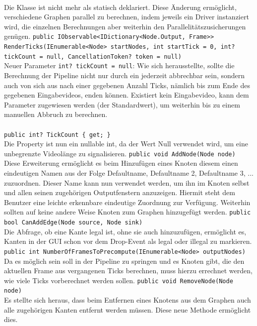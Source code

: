 \paragraph{}
\begin{itemize}
	\change Die Klasse ist nicht mehr als statisch deklariert. Diese Änderung ermöglicht, verschiedene Graphen parallel zu berechnen, indem jeweils ein Driver instanziert wird, die einzelnen Berechnungen aber weiterhin den Parallelitätszusicherungen genügen.
	\add \verb!public IObservable<IDictionary<Node.Output, Frame>> RenderTicks(IEnumerable<Node> startNodes, int startTick = 0, int? tickCount = null, CancellationToken? token = null)! \\
	Neuer Parameter \verb!int? tickCount = null!: Wie sich herausstellte, sollte die Berechnung der Pipeline nicht nur durch ein  jederzeit abbrechbar sein, sondern auch von sich aus nach einer gegebenen Anzahl Ticks, nämlich bis zum Ende des gegebenen Eingabevideos, enden können. Existiert kein Eingabevideo, kann dem Parameter  zugewiesen werden (der Standardwert), um weiterhin bis zu einem manuellen Abbruch zu berechnen.
\end{itemize}

\paragraph{}
\begin{itemize}
	\change \verb!public int? TickCount { get; }! \\
	Die Property ist nun ein nullable int, da der Wert Null verwendet wird, um eine unbegrenzte Videolänge zu signalisieren.
	\add \verb!public void AddNode(Node node)! \\
	Diese Erweiterung ermöglicht es beim Hinzufügen eines Knoten diesem einen eindeutigen Namen aus der Folge Defaultname, Defaultname 2, Defaultname 3, ... zuzuordnen. Dieser Name kann nun verwendet werden, um ihn im Knoten selbst und allen seinen zugehörigen Outputfenstern anzuzeigen. Hiermit steht dem Benutzer eine leichte erkennbare eindeutige Zuordnung zur Verfügung. Weiterhin sollten auf keine andere Weise Knoten zum Graphen hinzugefügt werden.
	\add \verb!public bool CanAddEdge(Node source, Node sink)! \\
	Die Abfrage, ob eine Kante legal ist, ohne sie auch hinzuzufügen, ermöglicht es, Kanten in der GUI schon vor dem Drop-Event als legal oder illegal zu markieren.
	\add \verb!public int NumberOfFramesToPrecompute(IEnumerable<Node> outputNodes)! \\
	Da es möglich sein soll in der Pipeline zu springen und es Knoten gibt, die den aktuellen Frame aus vergangenen Ticks berechnen, muss hierzu errechnet werden, wie viele Ticks vorberechnet werden sollen.
	\add \verb!public void RemoveNode(Node node)! \\
	Es stellte sich heraus, dass beim Entfernen eines Knotens aus dem Graphen auch alle zugehörigen Kanten entfernt werden müssen. Diese neue Methode ermöglicht dies.
\end{itemize}

